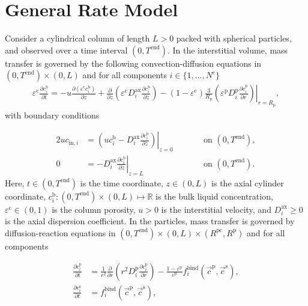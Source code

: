 \documentclass{article}
\begin{document}
\section*{General Rate Model}
Consider a cylindrical column of length $L > 0$ packed with spherical particles, and observed over a time interval $(0, T^{\mathrm{end}})$.
In the interstitial volume, mass transfer is governed by the following convection-diffusion equations in $(0, T^\mathrm{end})\times (0, L)$ and for all components $i\in\{1, \dots, N^{\mathrm{c}} \}$
\begin{align}
\varepsilon^{\mathrm{c}} \frac{\partial c^{\mathrm{b}}_i}{\partial t} = - u \frac{\partial \left( \varepsilon^{\mathrm{c}} c^{\mathrm{b}}_i \right)}{\partial z} + \frac{\partial}{\partial z} \left( \varepsilon^{\mathrm{c}} D^{\mathrm{ax}}_{i} \frac{\partial c^{\mathrm{b}}_i}{\partial z} \right)- \left(1 - \varepsilon^{\mathrm{c}} \right) \frac{3}{R_{\mathrm{p}}} \left( \varepsilon^{\mathrm{p}} D^{\mathrm{p}}_{i} \left. \frac{\partial c^{\mathrm{p}}_{i}}{\partial r}\right)\right|_{r = R_{\mathrm{p}}},
\end{align}
with boundary conditions

\begin{alignat}{2}
u c_{\mathrm{in},i} &= \left.\left( u c^{\mathrm{b}}_i - D^{\mathrm{ax}}_{i} \frac{\partial c^{\mathrm{b}}_i}{\partial z}\right)\right|_{z=0} & &\qquad\text{on }(0, T^{\mathrm{end}}),\\
               0 &= - D^{\mathrm{ax}}_{i} \left. \frac{\partial c^{\mathrm{b}}_i}{\partial z} \right|_{z=L} & &\qquad\text{on }(0, T^{\mathrm{end}}).
\end{alignat}
Here, $t\in (0, T^{\mathrm{end}})$ is the time coordinate, $z\in (0, L)$ is the axial cylinder coordinate, $c^{\mathrm{b}}_i\colon (0, T^\mathrm{end})\times (0, L) \mapsto \mathbb{R}$ is the bulk liquid concentration, $\varepsilon^{\mathrm{c}}\in (0, 1)$ is the column porosity, $u> 0$ is the interstitial velocity, and $D^\mathrm{ax}_i\geq 0$ is the axial dispersion coefficient.
In the particles, mass transfer is governed by diffusion-reaction equations in $ (0, T^\mathrm{end}) \times (0, L)\times (R^{\mathrm{pc}}, R^{\mathrm{p}})$ and for all components

\begin{align}
\frac{\partial c^{\mathrm{p}}_{i}}{\partial t} &= \frac{1}{r^2} \frac{\partial }{\partial r} \left( r^2 D_{i}^{\mathrm{p}} \frac{\partial c^{\mathrm{p}}_{i}}{\partial r} \right) - \frac{1 - \varepsilon^{\mathrm{p}}}{\varepsilon^{\mathrm{p}}}f^{\mathrm{bind}}_{i}\left( \vec{c}^{\mathrm{p}}, \vec{c}^{\mathrm{s}} \right) , \\
\frac{\partial c^{\mathrm{s}}_{i}}{\partial t} &= f^{\mathrm{bind}}_{i}\left( \vec{c}^{\mathrm{p}}, \vec{c}^{\mathrm{s}} \right) ,
\end{align}
\end{document}
